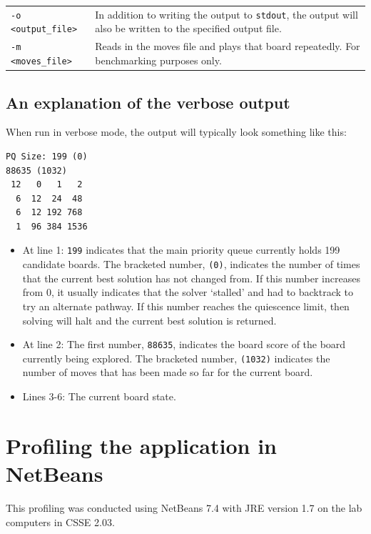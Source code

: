 \documentclass[a4paper, 11pt, titlepage]{report}
\begin{document}
\begin{appendices}
\begin{table}[H]
\begin{tabularx}{\textwidth}{lX}
    \texttt{-o <output\_file>} & In addition to writing the output to \texttt{stdout}, the output will also be written to the specified output file. \\
    \texttt{-m <moves\_file>} & Reads in the moves file and plays that board repeatedly. For benchmarking purposes only. \\
    \hline
    \end{tabularx}%
  \label{tab:method2-parameters}%
\end{table}%

\section{An explanation of the verbose output}
When run in verbose mode, the output will typically look something like this:
\begin{lstlisting}
PQ Size: 199 (0)
88635 (1032)
 12   0   1   2
  6  12  24  48
  6  12 192 768
  1  96 384 1536
\end{lstlisting}

\begin{itemize}
\item At line 1: \texttt{199} indicates that the main priority queue currently holds 199 candidate boards. The bracketed number, \texttt{(0)}, indicates the number of times that the current best solution has not changed from. If this number increases from 0, it usually indicates that the solver `stalled' and had to backtrack to try an alternate pathway. If this number reaches the quiescence limit, then solving will halt and the current best solution is returned.
\item At line 2: The first number, \texttt{88635}, indicates the board score of the board currently being explored. The bracketed number, \texttt{(1032)} indicates the number of moves that has been made so far for the current board. 
\item Lines 3-6: The current board state.
\end{itemize}

\chapter{Profiling the application in NetBeans}\label{appendix-profiling}
This profiling was conducted using NetBeans 7.4 with JRE version 1.7 on the lab computers in CSSE 2.03.


\end{appendices}
\end{document}
